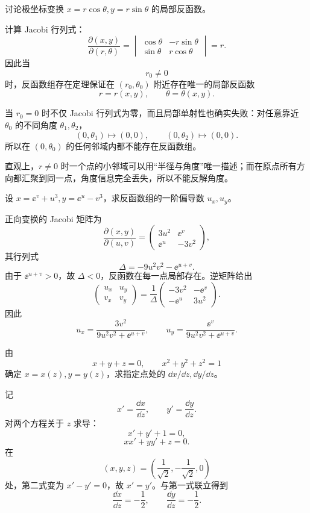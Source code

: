 \begin{xthought}[20.2.2 思考题 2]
讨论极坐标变换 $x=r\cos\theta,y=r\sin\theta$ 的局部反函数。
\end{xthought}
\begin{xsolution}
计算 Jacobi 行列式：
\[
  \frac{\partial(x,y)}{\partial(r,\theta)}
  =\begin{vmatrix}
    \cos\theta&-r\sin\theta\\
    \sin\theta&r\cos\theta
  \end{vmatrix}
  =r.
\]
因此当
\[
  \boxed{r_0\ne0}
\]
时，反函数组存在定理保证在 $(r_0,\theta_0)$ 附近存在唯一的局部反函数
\[
  r=r(x,y),\qquad \theta=\theta(x,y).
\]

当 $r_0=0$ 时不仅 Jacobi 行列式为零，而且局部单射性也确实失败：对任意靠近 $\theta_0$ 的不同角度 $\theta_1,\theta_2$，
\[
  (0,\theta_1)\mapsto(0,0),
  \qquad
  (0,\theta_2)\mapsto(0,0).
\]
所以在 $(0,\theta_0)$ 的任何邻域内都不能存在反函数组。

直观上，$r\ne0$ 时一个点的小邻域可以用“半径与角度”唯一描述；而在原点所有方向都汇聚到同一点，角度信息完全丢失，所以不能反解角度。
\end{xsolution}

\begin{xexercise}[20.2.5 练习题 1]
设 $x=\ee^v+u^3,y=\ee^u-v^3$，求反函数组的一阶偏导数 $u_x,u_y$。
\end{xexercise}
\begin{xsolution}
正向变换的 Jacobi 矩阵为
\[
  \frac{\partial(x,y)}{\partial(u,v)}
  =\begin{pmatrix}
    3u^2&\ee^v\\
    \ee^u&-3v^2
  \end{pmatrix},
\]
其行列式
\[
  \Delta=-9u^2v^2-\ee^{u+v}.
\]
由于 $\ee^{u+v}>0$，故 $\Delta<0$，反函数在每一点局部存在。逆矩阵给出
\[
  \begin{pmatrix}
    u_x&u_y\\v_x&v_y
  \end{pmatrix}
  =\frac1\Delta
  \begin{pmatrix}
    -3v^2&-\ee^v\\
    -\ee^u&3u^2
  \end{pmatrix}.
\]
因此
\[
  \boxed{\displaystyle
    u_x=\frac{3v^2}{9u^2v^2+\ee^{u+v}},\qquad
    u_y=\frac{\ee^v}{9u^2v^2+\ee^{u+v}}}.
\]
\end{xsolution}

\begin{xexercise}[20.2.5 练习题 2]
由
\[
  x+y+z=0,\qquad x^2+y^2+z^2=1
\]
确定 $x=x(z),y=y(z)$，求指定点处的 $\dd x/\dd z,\dd y/\dd z$。
\end{xexercise}
\begin{xsolution}
记
\[
  x'=\frac{\dd x}{\dd z},\qquad y'=\frac{\dd y}{\dd z}.
\]
对两个方程关于 $z$ 求导：
\[
  x'+y'+1=0,
\]
\[
  xx'+yy'+z=0.
\]
在
\[
  \left(x,y,z\right)
  =\left(\frac1{\sqrt2},-\frac1{\sqrt2},0\right)
\]
处，第二式变为 $x'-y'=0$，故 $x'=y'$。与第一式联立得到
\[
  \boxed{\displaystyle
    \frac{\dd x}{\dd z}=-\frac12,
    \qquad
    \frac{\dd y}{\dd z}=-\frac12}.
\]
\end{xsolution}

